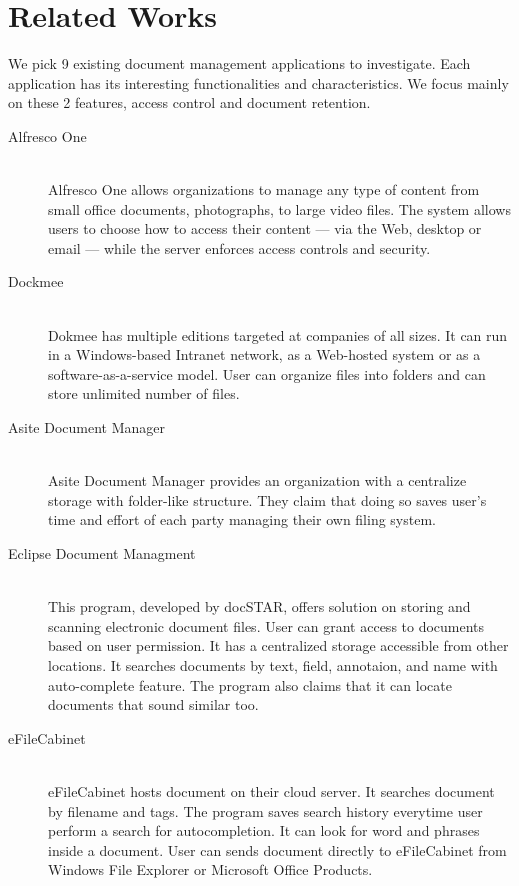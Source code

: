 \section{Related Works} \label{relate-works}
We pick 9 existing document management applications to investigate.
Each application has its interesting functionalities and characteristics.
We focus mainly on these 2 features, access control and document retention.
\begin{description}
\item[Alfresco One] \hfill \\
Alfresco One allows organizations to manage any type of content from small office documents, photographs, to large video files.
The system allows users to choose how to access their content --- via the Web, desktop or email --- while the server enforces access controls and security.

\item[Dockmee] \hfill \\
Dokmee has multiple editions targeted at companies of all sizes.
It can run in a Windows-based Intranet network, as a Web-hosted system or as a software-as-a-service model.
User can organize files into folders and can store unlimited number of files.

\item[Asite Document Manager] \hfill \\
Asite Document Manager provides an organization with a centralize storage with folder-like structure.
They claim that doing so saves user's time and effort of each party managing their own filing system.

\item[Eclipse Document Managment] \hfill \\
This program, developed by docSTAR, offers solution on storing and scanning electronic document files.
User can grant access to documents based on user permission.
It has a centralized storage accessible from other locations.
It searches documents by text, field, annotaion, and name with auto-complete feature.
The program also claims that it can locate documents that sound similar too.

\item[eFileCabinet] \hfill \\
eFileCabinet hosts document on their cloud server.
It searches document by filename and tags.
The program saves search history everytime user perform a search for autocompletion.
It can look for word and phrases inside a document.
User can sends document directly to eFileCabinet from Windows File Explorer or Microsoft Office Products.


\end{description}
